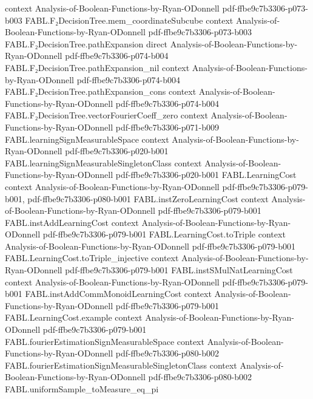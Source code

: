 \begin{theorem}
  {context}
  {Analysis-of-Boolean-Functions-by-Ryan-ODonnell}
  {pdf-ffbe9c7b3306-p073-b003}
\proofstep
  {FABL.F₂DecisionTree.mem_coordinateSubcube}
  {context}
  {Analysis-of-Boolean-Functions-by-Ryan-ODonnell}
  {pdf-ffbe9c7b3306-p073-b003}
\proofstep
  {FABL.F₂DecisionTree.pathExpansion}
  {direct}
  {Analysis-of-Boolean-Functions-by-Ryan-ODonnell}
  {pdf-ffbe9c7b3306-p074-b004}
\proofstep
  {FABL.F₂DecisionTree.pathExpansion_nil}
  {context}
  {Analysis-of-Boolean-Functions-by-Ryan-ODonnell}
  {pdf-ffbe9c7b3306-p074-b004}
\proofstep
  {FABL.F₂DecisionTree.pathExpansion_cons}
  {context}
  {Analysis-of-Boolean-Functions-by-Ryan-ODonnell}
  {pdf-ffbe9c7b3306-p074-b004}
\proofstep
  {FABL.F₂DecisionTree.vectorFourierCoeff_zero}
  {context}
  {Analysis-of-Boolean-Functions-by-Ryan-ODonnell}
  {pdf-ffbe9c7b3306-p071-b009}
\proofstep
  {FABL.learningSignMeasurableSpace}
  {context}
  {Analysis-of-Boolean-Functions-by-Ryan-ODonnell}
  {pdf-ffbe9c7b3306-p020-b001}
\proofstep
  {FABL.learningSignMeasurableSingletonClass}
  {context}
  {Analysis-of-Boolean-Functions-by-Ryan-ODonnell}
  {pdf-ffbe9c7b3306-p020-b001}
\proofstep
  {FABL.LearningCost}
  {context}
  {Analysis-of-Boolean-Functions-by-Ryan-ODonnell}
  {pdf-ffbe9c7b3306-p079-b001,
    pdf-ffbe9c7b3306-p080-b001}
\proofstep
  {FABL.instZeroLearningCost}
  {context}
  {Analysis-of-Boolean-Functions-by-Ryan-ODonnell}
  {pdf-ffbe9c7b3306-p079-b001}
\proofstep
  {FABL.instAddLearningCost}
  {context}
  {Analysis-of-Boolean-Functions-by-Ryan-ODonnell}
  {pdf-ffbe9c7b3306-p079-b001}
\proofstep
  {FABL.LearningCost.toTriple}
  {context}
  {Analysis-of-Boolean-Functions-by-Ryan-ODonnell}
  {pdf-ffbe9c7b3306-p079-b001}
\proofstep
  {FABL.LearningCost.toTriple_injective}
  {context}
  {Analysis-of-Boolean-Functions-by-Ryan-ODonnell}
  {pdf-ffbe9c7b3306-p079-b001}
\proofstep
  {FABL.instSMulNatLearningCost}
  {context}
  {Analysis-of-Boolean-Functions-by-Ryan-ODonnell}
  {pdf-ffbe9c7b3306-p079-b001}
\proofstep
  {FABL.instAddCommMonoidLearningCost}
  {context}
  {Analysis-of-Boolean-Functions-by-Ryan-ODonnell}
  {pdf-ffbe9c7b3306-p079-b001}
\proofstep
  {FABL.LearningCost.example}
  {context}
  {Analysis-of-Boolean-Functions-by-Ryan-ODonnell}
  {pdf-ffbe9c7b3306-p079-b001}
\proofstep
  {FABL.fourierEstimationSignMeasurableSpace}
  {context}
  {Analysis-of-Boolean-Functions-by-Ryan-ODonnell}
  {pdf-ffbe9c7b3306-p080-b002}
\proofstep
  {FABL.fourierEstimationSignMeasurableSingletonClass}
  {context}
  {Analysis-of-Boolean-Functions-by-Ryan-ODonnell}
  {pdf-ffbe9c7b3306-p080-b002}
\proofstep
  {FABL.uniformSample_toMeasure_eq_pi}

\end{theorem}
